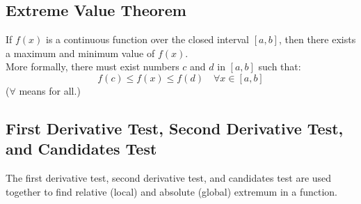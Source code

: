 \documentclass[12pt]{article}
\begin{document}
        \subsection{Extreme Value Theorem}
            If $f(x)$ is a continuous function over the closed interval $[a, b]$, then there exists a maximum and minimum value of $f(x)$.
            \\ More formally, there must exist numbers $c$ and $d$ in $[a, b]$ such that:
            \[ f(c) \le f(x) \le f(d) \quad \forall x \in [a, b] \]
            ($\forall$ means for all.)

        \subsection{First Derivative Test, Second Derivative Test, and Candidates Test}
            The first derivative test, second derivative test, and candidates test are used together to find relative (local) and absolute (global) extremum in a function.
\end{document}
